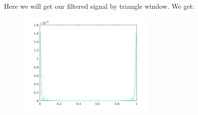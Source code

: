 \documentclass[a4paper,11pt]{article}
\begin{document}
Here we will get our filtered signal by triangle window. We get:

\begin{figure}[!hp]
    \begin{center}
      \includegraphics[width=0.6\textwidth]{images/lab2_26.jpg}
    \end{center}
\end{figure}
\end{document}
